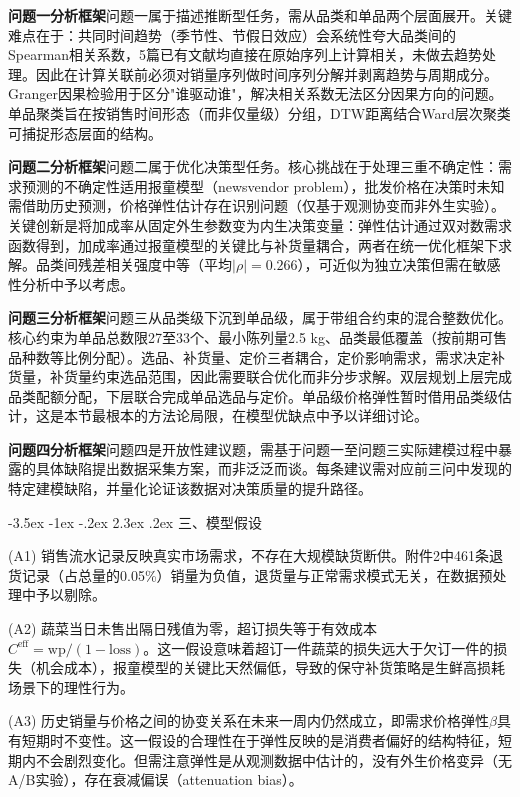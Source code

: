 \documentclass[12pt,a4paper]{article}
\makeatletter
\renewcommand{\section}{\@startsection{section}{1}{\z@}%
  {-3.5ex \@plus -1ex \@minus -.2ex}%
  {2.3ex \@plus.2ex}%
  {\centering\normalfont\Large\bfseries}}
\makeatother
\begin{document}
\textbf{问题一分析框架}\quad 问题一属于描述推断型任务，需从品类和单品两个层面展开。关键难点在于：共同时间趋势（季节性、节假日效应）会系统性夸大品类间的Spearman相关系数，5篇已有文献均直接在原始序列上计算相关，未做去趋势处理。因此在计算关联前必须对销量序列做时间序列分解并剥离趋势与周期成分。Granger因果检验用于区分"谁驱动谁"，解决相关系数无法区分因果方向的问题。单品聚类旨在按销售时间形态（而非仅量级）分组，DTW距离结合Ward层次聚类可捕捉形态层面的结构。

\textbf{问题二分析框架}\quad 问题二属于优化决策型任务。核心挑战在于处理三重不确定性：需求预测的不确定性适用报童模型（newsvendor problem），批发价格在决策时未知需借助历史预测，价格弹性估计存在识别问题（仅基于观测协变而非外生实验）。关键创新是将加成率从固定外生参数变为内生决策变量：弹性估计通过双对数需求函数得到，加成率通过报童模型的关键比与补货量耦合，两者在统一优化框架下求解。品类间残差相关强度中等（平均$|\rho|=0.266$），可近似为独立决策但需在敏感性分析中予以考虑。

\textbf{问题三分析框架}\quad 问题三从品类级下沉到单品级，属于带组合约束的混合整数优化。核心约束为单品总数限27至33个、最小陈列量2.5 kg、品类最低覆盖（按前期可售品种数等比例分配）。选品、补货量、定价三者耦合，定价影响需求，需求决定补货量，补货量约束选品范围，因此需要联合优化而非分步求解。双层规划上层完成品类配额分配，下层联合完成单品选品与定价。单品级价格弹性暂时借用品类级估计，这是本节最根本的方法论局限，在模型优缺点中予以详细讨论。

\textbf{问题四分析框架}\quad 问题四是开放性建议题，需基于问题一至问题三实际建模过程中暴露的具体缺陷提出数据采集方案，而非泛泛而谈。每条建议需对应前三问中发现的特定建模缺陷，并量化论证该数据对决策质量的提升路径。

\section{三、模型假设}

(A1) 销售流水记录反映真实市场需求，不存在大规模缺货断供。附件2中461条退货记录（占总量的0.05\%）销量为负值，退货量与正常需求模式无关，在数据预处理中予以剔除。

(A2) 蔬菜当日未售出隔日残值为零，超订损失等于有效成本$C^{\text{eff}} = \text{wp}/(1-\text{loss})$。这一假设意味着超订一件蔬菜的损失远大于欠订一件的损失（机会成本），报童模型的关键比天然偏低，导致的保守补货策略是生鲜高损耗场景下的理性行为。

(A3) 历史销量与价格之间的协变关系在未来一周内仍然成立，即需求价格弹性$\beta$具有短期时不变性。这一假设的合理性在于弹性反映的是消费者偏好的结构特征，短期内不会剧烈变化。但需注意弹性是从观测数据中估计的，没有外生价格变异（无A/B实验），存在衰减偏误（attenuation bias）。
\end{document}
